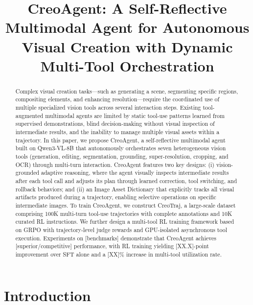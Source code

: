 \documentclass[11pt]{article}
\title{CreoAgent: A Self-Reflective Multimodal Agent for Autonomous Visual Creation with Dynamic Multi-Tool Orchestration}
\author{}
\date{}
\begin{document}
\maketitle


\begin{abstract}

Complex visual creation tasks—such as generating a scene, segmenting specific regions, compositing elements, and enhancing resolution—require the coordinated use of multiple specialized vision tools across several interaction steps. Existing tool-augmented multimodal agents are limited by static tool-use patterns learned from supervised demonstrations, blind decision-making without visual inspection of intermediate results, and the inability to manage multiple visual assets within a trajectory. In this paper, we propose CreoAgent, a self-reflective multimodal agent built on Qwen3-VL-8B that autonomously orchestrates seven heterogeneous vision tools (generation, editing, segmentation, grounding, super-resolution, cropping, and OCR) through multi-turn interaction. CreoAgent features two key designs: (i) vision-grounded adaptive reasoning, where the agent visually inspects intermediate results after each tool call and adjusts its plan through learned correction, tool switching, and rollback behaviors; and (ii) an Image Asset Dictionary that explicitly tracks all visual artifacts produced during a trajectory, enabling selective operations on specific intermediate images. To train CreoAgent, we construct CreoTraj, a large-scale dataset comprising 100K multi-turn tool-use trajectories with complete annotations and 10K curated RL instructions. We further design a multi-tool RL training framework based on GRPO with trajectory-level judge rewards and GPU-isolated asynchronous tool execution. Experiments on [benchmarks] demonstrate that CreoAgent achieves [superior/competitive] performance, with RL training yielding [XX.X]-point improvement over SFT alone and a [XX]\% increase in multi-tool utilization rate.

\end{abstract}

\section{Introduction}
\end{document}
